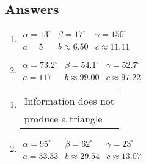 \newpage

\subsection{Answers}

\begin{multicols}{2}

\begin{enumerate}

\item $\begin{array}{lll}
\alpha = 13^{\circ} & \beta = 17^{\circ} & \gamma = 150^{\circ} \\
a = 5 & b \approx 6.50 & c \approx 11.11 \end{array}$

\item $\begin{array}{lll}
\alpha = 73.2^{\circ} & \beta = 54.1^{\circ} & \gamma = 52.7^{\circ} \\
a = 117 & b \approx 99.00 & c \approx 97.22 \end{array}$

\setcounter{HW}{\value{enumi}}

\end{enumerate}

\end{multicols}

\begin{multicols}{2} 

\begin{enumerate}

\setcounter{enumi}{\value{HW}}

\item \begin{tabular}{l}
Information does not \\
produce a triangle \end{tabular}

\item $\begin{array}{lll}
\alpha = 95^{\circ} & \beta = 62^{\circ} & \gamma = 23^{\circ} \\
a = 33.33 & b \approx 29.54 & c \approx 13.07 \end{array}$

\setcounter{HW}{\value{enumi}}

\end{enumerate}

\end{multicols}


